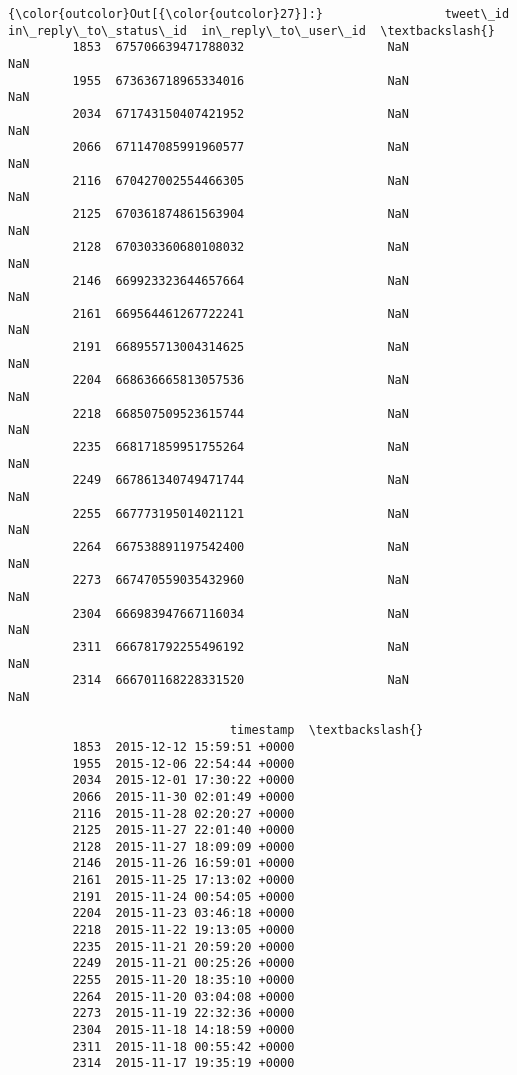 \documentclass[11pt]{article}
\begin{document}
\begin{Verbatim}[commandchars=\\\{\}]
{\color{outcolor}Out[{\color{outcolor}27}]:}                 tweet\_id  in\_reply\_to\_status\_id  in\_reply\_to\_user\_id  \textbackslash{}
         1853  675706639471788032                    NaN                  NaN   
         1955  673636718965334016                    NaN                  NaN   
         2034  671743150407421952                    NaN                  NaN   
         2066  671147085991960577                    NaN                  NaN   
         2116  670427002554466305                    NaN                  NaN   
         2125  670361874861563904                    NaN                  NaN   
         2128  670303360680108032                    NaN                  NaN   
         2146  669923323644657664                    NaN                  NaN   
         2161  669564461267722241                    NaN                  NaN   
         2191  668955713004314625                    NaN                  NaN   
         2204  668636665813057536                    NaN                  NaN   
         2218  668507509523615744                    NaN                  NaN   
         2235  668171859951755264                    NaN                  NaN   
         2249  667861340749471744                    NaN                  NaN   
         2255  667773195014021121                    NaN                  NaN   
         2264  667538891197542400                    NaN                  NaN   
         2273  667470559035432960                    NaN                  NaN   
         2304  666983947667116034                    NaN                  NaN   
         2311  666781792255496192                    NaN                  NaN   
         2314  666701168228331520                    NaN                  NaN   
         
                               timestamp  \textbackslash{}
         1853  2015-12-12 15:59:51 +0000   
         1955  2015-12-06 22:54:44 +0000   
         2034  2015-12-01 17:30:22 +0000   
         2066  2015-11-30 02:01:49 +0000   
         2116  2015-11-28 02:20:27 +0000   
         2125  2015-11-27 22:01:40 +0000   
         2128  2015-11-27 18:09:09 +0000   
         2146  2015-11-26 16:59:01 +0000   
         2161  2015-11-25 17:13:02 +0000   
         2191  2015-11-24 00:54:05 +0000   
         2204  2015-11-23 03:46:18 +0000   
         2218  2015-11-22 19:13:05 +0000   
         2235  2015-11-21 20:59:20 +0000   
         2249  2015-11-21 00:25:26 +0000   
         2255  2015-11-20 18:35:10 +0000   
         2264  2015-11-20 03:04:08 +0000   
         2273  2015-11-19 22:32:36 +0000   
         2304  2015-11-18 14:18:59 +0000   
         2311  2015-11-18 00:55:42 +0000   
         2314  2015-11-17 19:35:19 +0000   
         

\end{Verbatim}
\end{document}
